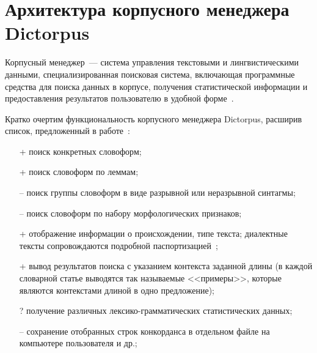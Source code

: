 
\section{Архитектура корпусного менеджера Dictorpus} \label{sect_arch_corpus_manager}

Корпусный менеджер~--- система управления текстовыми и лингвистическими данными, 
специализированная поисковая система, включающая программные средства для поиска данных в корпусе, получения статистической информации и предоставления результатов пользователю 
в удобной форме~\cite[с.~3]{Zakharov2005}.

Кратко очертим функциональность корпусного менеджера Dictorpus, расширив список, предложенный
в работе~\cite[с.~10--11]{Zakharov2005}:
\begin{itemize}
    \item[+] поиск конкретных словоформ;
    \item[+] поиск словоформ по леммам;
    \item[--] поиск группы словоформ в виде разрывной или неразрывной синтагмы;
    \item[--] поиск словоформ по набору морфологических признаков;
    \item[+] отображение информации о происхождении, типе текста; 
        диалектные тексты сопровождаются подробной паспортизацией~\cite{Krizhanovsky2019Architecture};
    \item[+] вывод результатов поиска с указанием контекста заданной длины (в каждой словарной статье выводятся так называемые <<примеры>>, которые являются контекстами длиной в одно предложение);
    \item[?] получение различных лексико-грамматических статистических данных;
    \item[--] сохранение отобранных строк конкорданса в отдельном файле на компьютере пользователя и др.;
    \item[] 
    \item[] 
    \item[] 
\end{itemize}
